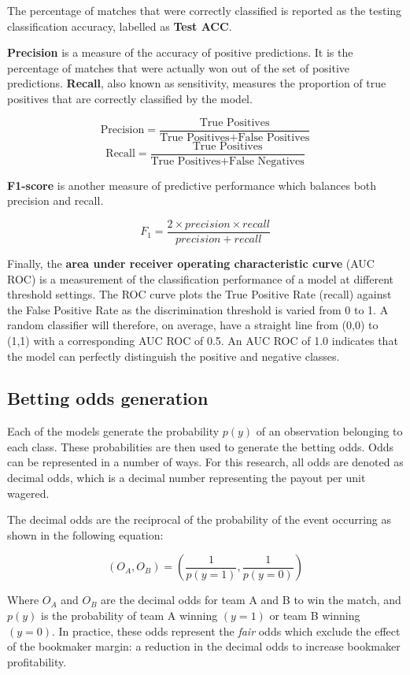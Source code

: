 The percentage of matches that were correctly classified is reported as the testing classification accuracy, labelled as \textbf{Test ACC}. 

\textbf{Precision} is a measure of the accuracy of positive predictions. It is the percentage of matches that were actually won out of the set of positive predictions. \textbf{Recall}, also known as sensitivity, measures the proportion of true positives that are correctly classified by the model.

\[ \text{Precision} = \frac{\text{True Positives}}{\text{True Positives} + \text{False Positives}} \]
\[ \text{Recall} = \frac{\text{True Positives}}{\text{True Positives} + \text{False Negatives}} \]

\textbf{F1-score} is another measure of predictive performance which balances both precision and recall. 

\[ F_1 = \frac{2 \times precision \times recall}{precision + recall} \]

Finally, the \textbf{area under receiver operating characteristic curve} (AUC ROC) is a measurement of the classification performance of a model at different threshold settings. The ROC curve plots the True Positive Rate (recall) against the False Positive Rate as the discrimination threshold is varied from 0 to 1. A random classifier will therefore, on average, have a straight line from (0,0) to (1,1) with a corresponding AUC ROC of 0.5. An AUC ROC of 1.0 indicates that the model can perfectly distinguish the positive and negative classes.

\subsection{Betting odds generation}

Each of the models generate the probability $p(y)$ of an observation belonging to each class. These probabilities are then used to generate the betting odds. Odds can be represented in a number of ways. For this research, all odds are denoted as decimal odds, which is a decimal number representing the payout per unit wagered. 

The decimal odds are the reciprocal of the probability of the event occurring as shown in the following equation:

\[ \left( O_A, O_B \right)  = \left( \frac{1}{p(y=1)}, \frac{1}{p(y=0)} \right) \]

Where $O_A$ and $O_B$ are the decimal odds for team A and B to win the match, and $p(y)$ is the probability of team A winning $(y=1)$ or team B winning $(y=0)$. In practice, these odds represent the \textit{fair} odds which exclude the effect of the bookmaker margin: a reduction in the decimal odds to increase bookmaker profitability.

